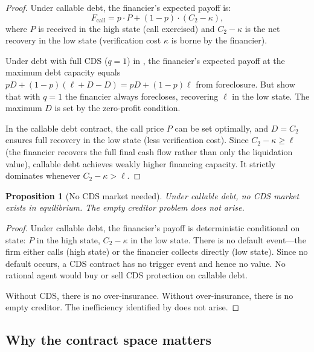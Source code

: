 \documentclass[12pt,a4paper]{article}
\theoremstyle{plain}
\newtheorem{proposition}[theorem]{Proposition}
\theoremstyle{definition}
\theoremstyle{remark}
\begin{document}
\begin{proof}
Under callable debt, the financier's expected payoff is:
\[
F_{\text{call}} = p \cdot P + (1-p) \cdot (C_2 - \kappa),
\]
where $P$ is received in the high state (call exercised) and $C_2 - \kappa$ is the net recovery in the low state (verification cost $\kappa$ is borne by the financier).

Under debt with full CDS ($q = 1$) in \citet{boltonoehmke2011}, the financier's expected payoff at the maximum debt capacity equals $pD + (1-p)(\ell + D - D) = pD + (1-p)\ell$ from foreclosure. But \citeauthor{boltonoehmke2011} show that with $q = 1$ the financier always forecloses, recovering $\ell$ in the low state. The maximum $D$ is set by the zero-profit condition.

In the callable debt contract, the call price $P$ can be set optimally, and $D = C_2$ ensures full recovery in the low state (less verification cost). Since $C_2 - \kappa \geq \ell$ (the financier recovers the full final cash flow rather than only the liquidation value), callable debt achieves weakly higher financing capacity. It strictly dominates whenever $C_2 - \kappa > \ell$.
\end{proof}

\begin{proposition}[No CDS market needed]\label{p:nocds}
Under callable debt, no CDS market exists in equilibrium. The empty creditor problem does not arise.
\end{proposition}

\begin{proof}
Under callable debt, the financier's payoff is deterministic conditional on state: $P$ in the high state, $C_2 - \kappa$ in the low state. There is no default event---the firm either calls (high state) or the financier collects directly (low state). Since no default occurs, a CDS contract has no trigger event and hence no value. No rational agent would buy or sell CDS protection on callable debt.

Without CDS, there is no over-insurance. Without over-insurance, there is no empty creditor. The inefficiency identified by \citet{boltonoehmke2011} does not arise.
\end{proof}

\subsection{Why the contract space matters}
\end{document}
